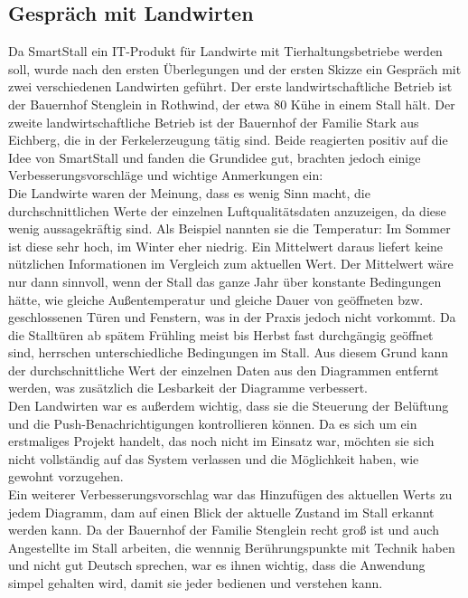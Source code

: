 \documentclass[conference]{IEEEtran}
\begin{document}
\subsection{Gespräch mit Landwirten}
Da SmartStall ein IT-Produkt für Landwirte mit Tierhaltungsbetriebe werden soll, wurde nach den ersten Überlegungen und der ersten Skizze ein Gespräch mit zwei verschiedenen Landwirten geführt. Der erste landwirtschaftliche Betrieb ist der Bauernhof Stenglein in Rothwind, der etwa 80 Kühe in einem Stall hält. Der zweite landwirtschaftliche Betrieb ist der Bauernhof der Familie Stark aus Eichberg, die in der Ferkelerzeugung tätig sind. Beide reagierten positiv auf die Idee von SmartStall und fanden die Grundidee gut, brachten jedoch einige Verbesserungsvorschläge und wichtige Anmerkungen ein: \\
Die Landwirte waren der Meinung, dass es wenig Sinn macht, die durchschnittlichen Werte der einzelnen Luftqualitätsdaten anzuzeigen, da diese wenig aussagekräftig sind. Als Beispiel nannten sie die Temperatur: Im Sommer ist diese sehr hoch, im Winter eher niedrig. Ein Mittelwert daraus liefert keine nützlichen Informationen im Vergleich zum aktuellen Wert. Der Mittelwert wäre nur dann sinnvoll, wenn der Stall das ganze Jahr über konstante Bedingungen hätte, wie gleiche Außentemperatur und gleiche Dauer von geöffneten bzw. geschlossenen Türen und Fenstern, was in der Praxis jedoch nicht vorkommt. Da die Stalltüren ab spätem Frühling meist bis Herbst fast durchgängig geöffnet sind, herrschen unterschiedliche Bedingungen im Stall. Aus diesem Grund kann der durchschnittliche Wert der einzelnen Daten aus den Diagrammen entfernt werden, was zusätzlich die Lesbarkeit der Diagramme verbessert. \\
Den Landwirten war es außerdem wichtig, dass sie die Steuerung der Belüftung und die Push-Benachrichtigungen kontrollieren können. Da es sich um ein erstmaliges Projekt handelt, das noch nicht im Einsatz war, möchten sie sich nicht vollständig auf das System verlassen und die Möglichkeit haben, wie gewohnt vorzugehen. \\
Ein weiterer Verbesserungsvorschlag war das Hinzufügen des aktuellen Werts zu jedem Diagramm, dam auf einen Blick der aktuelle Zustand im Stall erkannt werden kann.
Da der Bauernhof der Familie Stenglein recht groß ist und auch Angestellte im Stall arbeiten, die wennnig Berührungspunkte mit Technik haben und nicht gut Deutsch sprechen, war es ihnen wichtig, dass die Anwendung simpel gehalten wird, damit sie jeder bedienen und verstehen kann.
\end{document}
